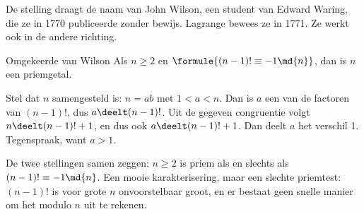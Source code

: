 De stelling draagt de naam van John Wilson, een student van Edward Waring, die ze in 1770 publiceerde zonder bewijs. Lagrange bewees ze in 1771. Ze werkt ook in de andere richting.

\begin{theorie}
\begin{stelling}{Omgekeerde van Wilson}
Als $n \geqslant 2$ en $\formule{(n - 1)! \equiv -1 \md{n}}$, dan is $n$ een priemgetal.
\end{stelling}

\begin{bewijs}
Stel dat $n$ samengesteld is: $n = ab$ met $1 < a < n$. Dan is $a$ een van de factoren van $(n - 1)!$, dus $a \deelt (n - 1)!$. Uit de gegeven congruentie volgt $n \deelt (n - 1)! + 1$, en dus ook $a \deelt (n - 1)! + 1$. Dan deelt $a$ het verschil 1. Tegenspraak, want $a > 1$.
\end{bewijs}
\end{theorie}

De twee stellingen samen zeggen: $n \geqslant 2$ is priem als en slechts als $(n - 1)! \equiv -1 \md{n}$. Een mooie karakterisering, maar een slechte priemtest: $(n - 1)!$ is voor grote $n$ onvoorstelbaar groot, en er bestaat geen snelle manier om het modulo $n$ uit te rekenen.



\begin{oefeningen}
\end{oefeningen}

